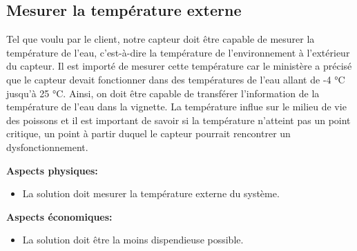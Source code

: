 \begin{table}[!htb]
\footnotesize
\centering
{}
\caption{Faisabilité des concepts pour assurer un accès sécurisé}
\label{t:Decision_re8guler}
\end{table}


\subsection{Mesurer la température externe} 
Tel que voulu par le client, notre capteur doit être capable de mesurer la température de l’eau, c’est-à-dire la température de l’environnement à l’extérieur du capteur. Il est importé de mesurer cette température car le ministère a précisé que le capteur devait fonctionner dans des températures de l’eau allant de -4 °C jusqu’à 25 °C. Ainsi, on doit être capable de transférer l’information de la température de l’eau dans la vignette. La température influe sur le milieu de vie des poissons et il est important de savoir si la température n’atteint pas un point critique, un point à partir duquel le capteur pourrait rencontrer un dysfonctionnement. 

\textbf{Aspects physiques:}
\begin{itemize}[label = {--}]
    \item La solution doit mesurer la température externe du système.
\end{itemize}

\textbf{Aspects économiques:}
\begin{itemize}[label = {--}]
    \item La solution doit être la moins dispendieuse possible.
\end{itemize}

